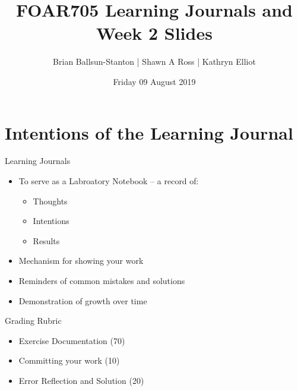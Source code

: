 \documentclass[aspectratio=169, 11pt]{beamer} %
\title{FOAR705 Learning Journals and Week 2 Slides} %
\author{Brian Ballsun-Stanton | Shawn A Ross | Kathryn Elliot}               %
\institute{Faculty of Arts}         %
\date{Friday 09 August 2019}                 %
\begin{document}

\maketitle

  


\section{Intentions of the Learning Journal}

\begin{frame}{Learning Journals}
\begin{itemize}[label=\textbullet]
    \item To serve as a Labroatory Notebook -- a record of:
    \begin{itemize}
        \item Thoughts
        \item Intentions
        \item Results
    \end{itemize}
    \item Mechanism for showing your work
    \item Reminders of common mistakes and solutions
    \item Demonstration of growth over time
\end{itemize}    
\end{frame}

\begin{frame}{Grading Rubric}
\begin{itemize}[label=\textbullet]
    \item Exercise Documentation (70)
    \item Committing your work (10)
    \item Error Reflection and Solution (20)
\end{itemize}    
\end{frame}


\end{document}
